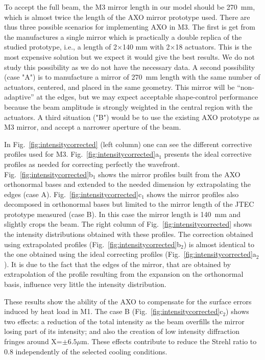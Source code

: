 \documentclass{iucr}
\begin{document}
To accept the full beam, the M3 mirror length in our model should be 270~mm, which is almost twice the length of the AXO mirror prototype used. There are thus three possible scenarios for implementing AXO in M3. The first is get from the manufactures a single mirror which is practically a double replica of the studied prototype, i.e., a length of 2$\times$140 mm with 2$\times$18 actuators. This is the most expensive solution but we expect it would give the best results. We do not study this possibility as we do not have the necessary data. A second possibility (case "A") is to manufacture a mirror of 270~mm length with the same number of actuators, centered, and placed in the same geometry. This mirror will be ``non-adaptive'' at the edges, but we may expect acceptable shape-control performance because the beam amplitude is strongly weighted in the central region with the actuators. A third situation ("B") would be to use the existing AXO prototype as M3 mirror, and accept a narrower aperture of the beam.

In Fig.~\ref{fig:intensitycorrected} (left column) one can see the different corrective profiles used for M3. 
Fig.~\ref{fig:intensitycorrected}a$_1$ presents the ideal corrective profiles as needed for correcting perfectly the wavefront. Fig.~\ref{fig:intensitycorrected}b$_1$ shows the mirror profiles built from the AXO orthonormal bases and extended to the needed dimension by extrapolating the edges (case A). Fig.~\ref{fig:intensitycorrected}c$_1$ shows the mirror profiles also decomposed in orthonormal bases but limited to the mirror length of the JTEC prototype measured (case B). In this case the mirror length is 140~mm and slightly crops the beam.
The right column of Fig.~\ref{fig:intensitycorrected} shows the intensity distributions obtained with these profiles.
The correction obtained using extrapolated profiles (Fig.~\ref{fig:intensitycorrected}b$_2$) is almost identical to the one obtained using the ideal correcting profiles (Fig.~\ref{fig:intensitycorrected}a$_2$). It is due to the fact that the edges of the mirror, that are obtained by extrapolation of the profile resulting from the expansion on the orthonormal basis, influence very little the intensity distribution.

These results show the ability of the AXO to compensate for the surface errors induced by heat load in M1. The case B (Fig.~\ref{fig:intensitycorrected}c$_2$) shows two effects: a reduction of the total intensity as the beam overfills the mirror losing part of its intensity; and also the creation of low intensity diffraction fringes around X=$\pm6.5\mu$m. These effects contribute to reduce the Strehl ratio to 0.8 independently of the selected cooling conditions.
\end{document}
